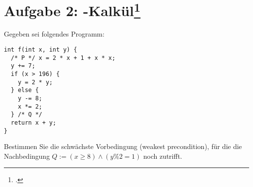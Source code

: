 \documentclass{lehramt-informatik-aufgabe}
\begin{document}

\section{Aufgabe 2:
-Kalkül\footcite{sosy:ab:8}}

Gegeben sei folgendes Programm:

\begin{verbatim}
int f(int x, int y) {
  /* P */ x = 2 * x + 1 + x * x;
  y += 7;
  if (x > 196) {
    y = 2 * y;
  } else {
    y -= 8;
    x *= 2;
  } /* Q */
  return x + y;
}
\end{verbatim}

Bestimmen Sie die schwächste Vorbedingung (weakest precondition), für
die die Nachbedingung $Q := (x \geq 8) \land (y \% 2 = 1)$ noch
zutrifft.
\end{document}
